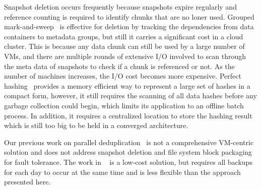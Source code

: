 Snapshot deletion 
occurs frequently because snapshots expire regularly
and reference counting is required to identify chunks that are no loner used.
Grouped mark-and-sweep~\cite{Guo2011} is effective for deletion by tracking
the dependencies from data containers to metadata groups, but still it carries
a significant cost in a cloud cluster. This is because any data chunk can still be
used by a large number of VMs, and there are multiple rounds of extensive I/O involved
to scan through the meta data of snapshots to check if a chunk is referenced or not.
As the number of machines increases, the I/O cost becomes more expensive.
Perfect hashing~\cite{Fabiano2013} provides a memory efficient way to represent a large set of
hashes in a compact form, however, it still requires the scanning of all data hashes before any 
garbage collection could begin, which limits its application to an offline batch process. 
In addition, it requires a centralized location
to store the hashing result which is still too big to be held in a converged architecture.



Our previous work on parallel deduplication~\cite{zhangusenix13,WeiZhangIEEE} 
is not a comprehensive VM-centric solution and does not address  snapshot deletion and file system block 
packaging for fault tolerance.  The work in ~\cite{zhangusenix13} is a low-cost
solution, but requires all backups for each day to occur at the same time and is less flexible than the approach presented here.




